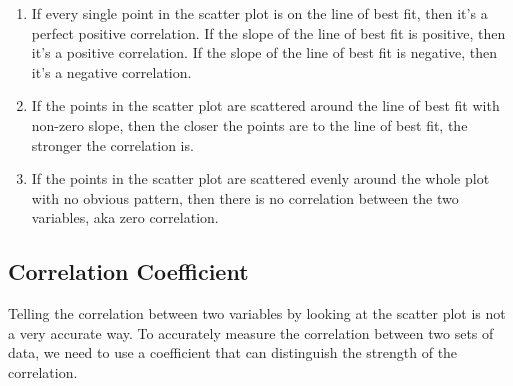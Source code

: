 \documentclass{report}
\begin{document}
\begin{multicols}{2}
  \begin{enumerate}
    \item If every single point in the scatter plot is on the line of best fit, then it's
          a perfect positive correlation. If the slope of the line of best fit is
          positive, then it's a positive correlation. If the slope of the line of best
          fit is negative, then it's a negative correlation.

    \item If the points in the scatter plot are scattered around the line of best fit
          with non-zero slope, then the closer the points are to the line of best fit,
          the stronger the correlation is.

    \item If the points in the scatter plot are scattered evenly around the whole plot
          with no obvious pattern, then there is no correlation between the two
          variables, aka zero correlation.
  \end{enumerate}

  \subsection*{Correlation Coefficient}

  Telling the correlation between two variables by looking at the scatter plot is
  not a very accurate way. To accurately measure the correlation between two sets
  of data, we need to use a coefficient that can distinguish the strength of the
  correlation.

  \begin{center}
  \end{center}


\end{multicols}
\end{document}
